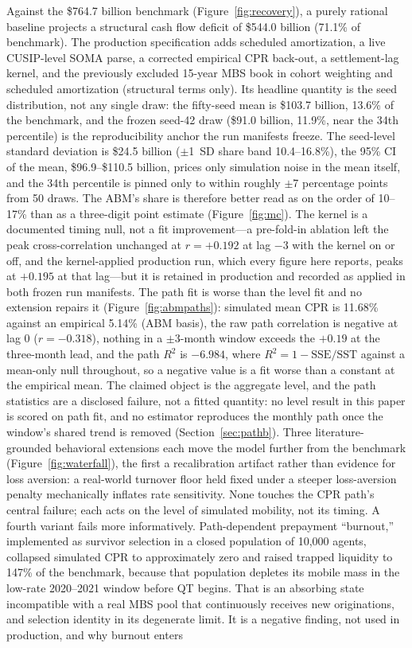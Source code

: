 Against the \$764.7 billion benchmark (Figure~\ref{fig:recovery}), a purely rational baseline projects a structural cash flow deficit of \$544.0 billion (71.1\% of benchmark). The production specification adds scheduled amortization, a live CUSIP-level SOMA parse, a corrected empirical CPR back-out, a settlement-lag kernel, and the previously excluded 15-year MBS book in cohort weighting and scheduled amortization (structural terms only). Its headline quantity is the seed distribution, not any single draw: the fifty-seed mean is \$103.7 billion, 13.6\% of the benchmark, and the frozen seed-42 draw (\$91.0 billion, 11.9\%, near the 34th percentile) is the reproducibility anchor the run manifests freeze. The seed-level standard deviation is \$24.5 billion ($\pm$1~SD share band 10.4--16.8\%), the 95\% CI of the mean, \$96.9--\$110.5 billion, prices only simulation noise in the mean itself, and the 34th percentile is pinned only to within roughly $\pm$7 percentage points from 50 draws. The ABM's share is therefore better read as on the order of 10--17\% than as a three-digit point estimate (Figure~\ref{fig:mc}). The kernel is a documented timing null, not a fit improvement---a pre-fold-in ablation left the peak cross-correlation unchanged at $r = +0.192$ at lag $-3$ with the kernel on or off, and the kernel-applied production run, which every figure here reports, peaks at $+0.195$ at that lag---but it is retained in production and recorded as applied in both frozen run manifests. The path fit is worse than the level fit and no extension repairs it (Figure~\ref{fig:abmpaths}): simulated mean CPR is 11.68\% against an empirical 5.14\% (ABM basis), the raw path correlation is negative at lag 0 ($r = -0.318$), nothing in a $\pm$3-month window exceeds the $+0.19$ at the three-month lead, and the path $R^2$ is $-6.984$, where $R^2 = 1-\mathrm{SSE}/\mathrm{SST}$ against a mean-only null throughout, so a negative value is a fit worse than a constant at the empirical mean. The claimed object is the aggregate level, and the path statistics are a disclosed failure, not a fitted quantity: no level result in this paper is scored on path fit, and no estimator reproduces the monthly path once the window's shared trend is removed (Section~\ref{sec:pathb}). Three literature-grounded behavioral extensions each move the model further from the benchmark (Figure~\ref{fig:waterfall}), the first a recalibration artifact rather than evidence for loss aversion: a real-world turnover floor held fixed under a steeper loss-aversion penalty mechanically inflates rate sensitivity. None touches the CPR path's central failure; each acts on the level of simulated mobility, not its timing. A fourth variant fails more informatively. Path-dependent prepayment ``burnout,'' implemented as survivor selection in a closed population of 10,000 agents, collapsed simulated CPR to approximately zero and raised trapped liquidity to 147\% of the benchmark, because that population depletes its mobile mass in the low-rate 2020--2021 window before QT begins. That is an absorbing state incompatible with a real MBS pool that continuously receives new originations, and  selection identity in its degenerate limit. It is a negative finding, not used in production, and why burnout enters 